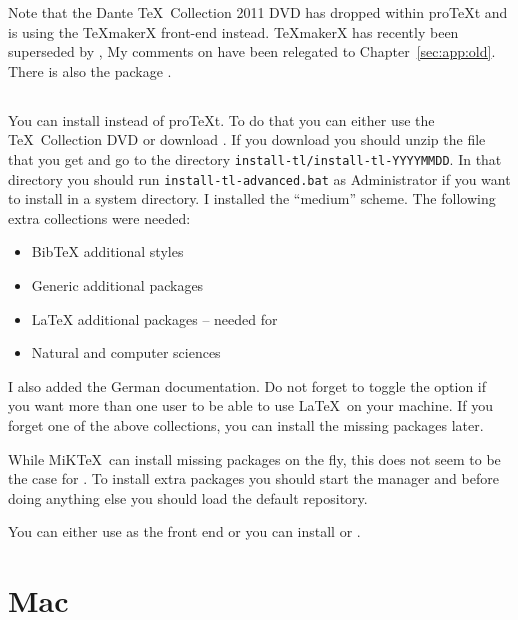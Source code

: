 Note that the Dante \TeX\ Collection 2011 DVD has dropped
\TeXnicCenter within pro\TeX t and is using the \TeX makerX front-end
instead. \TeX makerX has recently been superseded by \TeXstudio, My
comments on \TeXnicCenter have been relegated to
Chapter~\ref{sec:app:old}. There is also the package \TeXmaker.


\subsection{\TeXLive}
\label{sec:app:texlive}

You can install \TeXLive instead of pro\TeX t. To do that you can
either use the \TeX\ Collection DVD or download \TeXLive. If you
download \TeXLive you should unzip the file that you get and go to the
directory \texttt{install-tl/install-tl-YYYYMMDD}. In that directory you
should run \texttt{install-tl-advanced.bat} as Administrator if you want to install
\TeXLive in a system directory. I installed the \enquote{medium}
scheme. The following extra collections were needed:
\begin{itemize}
\item \textsf{BibTeX additional styles}
\item \textsf{Generic additional packages}
\item \textsf{LaTeX additional packages} -- needed for 
\item \textsf{Natural and computer sciences}
\end{itemize}
I also added the German documentation. Do not forget to toggle the
option  if you want more than one user to be able to
use \LaTeX\ on your machine. If you forget one of the above
collections, you can install the missing packages later.

While MiK\TeX\ can install missing packages on the fly, this does not
seem to be the case for \TeXLive. To install extra packages you should
start the \TeXLive manager and before doing anything else you should
load the default repository.

You can either use \TeXworks as the front end or you can install
\TeXstudio or \TeXmaker.



\section{Mac}
\label{sec:app:mac}


